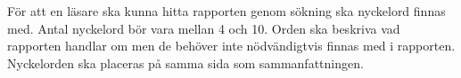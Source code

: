 För att en läsare ska kunna hitta rapporten genom sökning ska nyckelord finnas med. Antal nyckelord bör vara mellan 4 och 10. Orden ska beskriva vad rapporten handlar om men de behöver inte nödvändigtvis finnas med i rapporten. Nyckelorden ska placeras på samma sida som sammanfattningen.